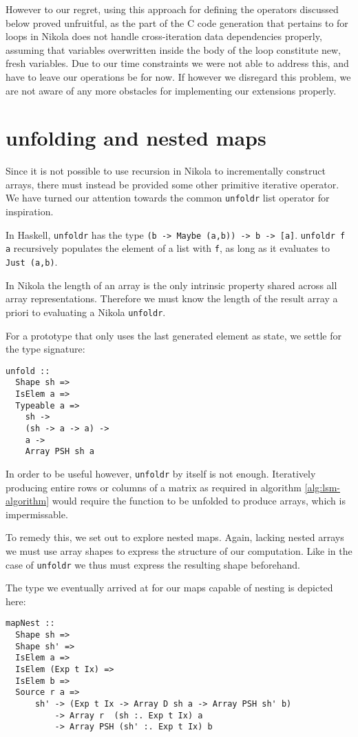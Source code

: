 However to our regret, using this approach for defining the operators discussed
below proved unfruitful, as the part of the C code generation that pertains to
for loops in Nikola does not handle cross-iteration data dependencies properly,
assuming that variables overwritten inside the body of the loop constitute new,
fresh variables. Due to our time constraints we were not able to address this,
and have to leave our operations be for now. If however we disregard this
problem, we are not aware of any more obstacles for implementing our extensions
properly.

\section{unfolding and nested maps}

Since it is not possible to use recursion in Nikola to incrementally construct
arrays, there must instead be provided some other primitive iterative operator.
We have turned our attention towards the common \texttt{unfoldr} list operator
for inspiration.

In Haskell, \texttt{unfoldr} has the type \texttt{(b -> Maybe (a,b)) -> b ->
[a]}.  \texttt{unfoldr f a} recursively populates the element of a list with
\texttt{f}, as long as it evaluates to \texttt{Just (a,b)}.

In Nikola the length of an array is the only intrinsic property shared across
all array representations. Therefore we must know the length of the result array a
priori to evaluating a Nikola \texttt{unfoldr}.

For a prototype that only uses the last generated element as state, we settle
for the type signature:
\begin{verbatim}
unfold ::
  Shape sh =>
  IsElem a =>
  Typeable a =>
    sh ->
    (sh -> a -> a) ->
    a ->
    Array PSH sh a
\end{verbatim}

In order to be useful however, \texttt{unfoldr} by itself is not enough.
Iteratively producing entire rows or columns of a matrix as required in
algorithm \ref{alg:lsm-algorithm} would require the function to be unfolded to produce
arrays, which is impermissable.

To remedy this, we set out to explore nested maps. Again, lacking nested arrays
we must use array shapes to express the structure of our computation.  Like in
the case of \texttt{unfoldr} we thus must express the resulting shape beforehand.

The type we eventually arrived at for our maps capable of nesting is depicted
here:
\begin{verbatim}
mapNest ::
  Shape sh =>
  Shape sh' =>
  IsElem a =>
  IsElem (Exp t Ix) =>
  IsElem b =>
  Source r a =>
      sh' -> (Exp t Ix -> Array D sh a -> Array PSH sh' b)
          -> Array r  (sh :. Exp t Ix) a
          -> Array PSH (sh' :. Exp t Ix) b
\end{verbatim}


